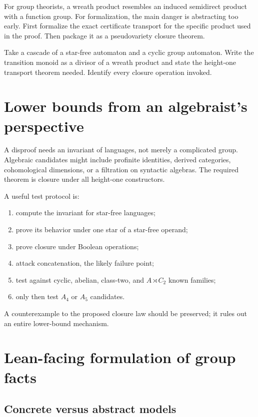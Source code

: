 \documentclass{amsart}
\begin{document}
For group theorists, a wreath product resembles an induced semidirect product with a function group.  For formalization, the main danger is abstracting too early.  First formalize the exact certificate transport for the specific product used in the proof.  Then package it as a pseudovariety closure theorem.

\begin{exercise}
Take a cascade of a star-free automaton and a cyclic group automaton.  Write the transition monoid as a divisor of a wreath product and state the height-one transport theorem needed.  Identify every closure operation invoked.
\end{exercise}

\section{Lower bounds from an algebraist's perspective}

A disproof needs an invariant of languages, not merely a complicated group.  Algebraic candidates might include profinite identities, derived categories, cohomological dimensions, or a filtration on syntactic algebras.  The required theorem is closure under all height-one constructors.

A useful test protocol is:
\begin{enumerate}
  \item compute the invariant for star-free languages;
  \item prove its behavior under one star of a star-free operand;
  \item prove closure under Boolean operations;
  \item attack concatenation, the likely failure point;
  \item test against cyclic, abelian, class-two, and $A\rtimes C_2$ known families;
  \item only then test $A_4$ or $A_5$ candidates.
\end{enumerate}
A counterexample to the proposed closure law should be preserved; it rules out an entire lower-bound mechanism.

\section{Lean-facing formulation of group facts}

\subsection{Concrete versus abstract models}
\end{document}
